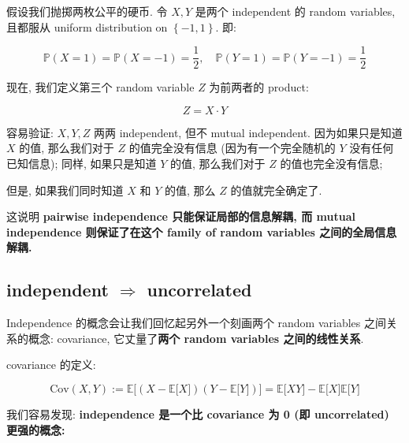 \documentclass{qlnotes-export}
\begin{document}
\begin{example}\label{ex-03-joint-conditional-distribution-pairwise-independence-does-not-imply-mutual-independence}

假设我们抛掷两枚公平的硬币. 令 \(X,Y\) 是两个 independent 的 random variables, 且都服从 uniform distribution on \(\left\{ {- 1,1} \right\}\). 即:

\[{\mathbb{P}}(X = 1) = {\mathbb{P}}(X = - 1) = \frac{1}{2},\quad{\mathbb{P}}(Y = 1) = {\mathbb{P}}(Y = - 1) = \frac{1}{2}\]

现在, 我们定义第三个 random variable \(Z\) 为前两者的 product:

\[Z = X \cdot Y\]

容易验证: \(X,Y,Z\) 两两 independent, 但不 mutual independent. 因为如果只是知道 \(X\) 的值, 那么我们对于 \(Z\) 的值完全没有信息 (因为有一个完全随机的 \(Y\) 没有任何已知信息); 同样, 如果只是知道 \(Y\) 的值, 那么我们对于 \(Z\) 的值也完全没有信息;

但是, 如果我们同时知道 \(X\) 和 \(Y\) 的值, 那么 \(Z\) 的值就完全确定了.

这说明 \textbf{pairwise independence 只能保证局部的信息解耦, 而 mutual independence 则保证了在这个 family of random variables 之间的全局信息解耦.}

\end{example}

\subsection{\texorpdfstring{independent \(\Longrightarrow\) uncorrelated}{independent \textbackslash Longrightarrow uncorrelated}}\label{independent-longrightarrow-uncorrelated}

Independence 的概念会让我们回忆起另外一个刻画两个 random variables 之间关系的概念: covariance, 它丈量了\textbf{两个 random variables 之间的线性关系}.

covariance 的定义:

\[\text{Cov}(X,Y) := {\mathbb{E}}\lbrack(X - {\mathbb{E}}\lbrack X\rbrack)(Y - {\mathbb{E}}\lbrack Y\rbrack)\rbrack = {\mathbb{E}}\lbrack XY\rbrack - {\mathbb{E}}\lbrack X\rbrack{\mathbb{E}}\lbrack Y\rbrack\]

我们容易发现: \textbf{independence 是一个比 covariance 为 0 (即 uncorrelated) 更强的概念:}
\end{document}
